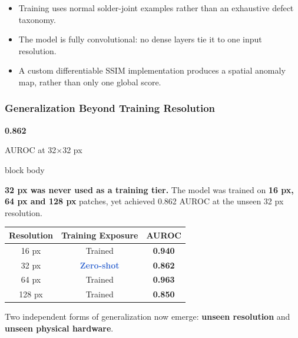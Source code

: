 \documentclass[aspectratio=169,11pt]{beamer}
\newcommand{\emphred}[1]{\textcolor{secondary}{#1}}
\newcommand{\emphhighlight}[1]{\textcolor{primary}{\textbf{#1}}}
\newcommand{\good}[1]{\textcolor{accent}{\textbf{#1}}}
\newcommand{\warning}[1]{\textcolor{highlight}{\textbf{#1}}}
\begin{document}
\begin{frame}
\begin{center}
\begin{tikzpicture}
\end{tikzpicture}

\end{center}

\vspace{0.15cm}

\begin{itemize}
    \item Training uses \emphred{normal solder-joint examples}
    rather than an exhaustive defect taxonomy.
    \item The model is fully convolutional:
    \emphred{no dense layers tie it to one input resolution}.
    \item A custom differentiable SSIM implementation produces a
    \emphred{spatial anomaly map}, rather than only one global score.
\end{itemize}

\end{frame}


\begin{frame}\frametitle{\emphred{Generalization Beyond Training Resolution}}

\begin{center}
{\fontsize{32}{36}\selectfont
\bfseries
\color{accent}
0.862}

{\footnotesize AUROC at 32$\times$32 px}

\vspace{0.08cm}

\begin{beamercolorbox}[
    wd=0.84\paperwidth,
    rounded=true,
    shadow=true,
    sep=0.3em
  ]{block body}
\begin{center}
\footnotesize
\textbf{32 px was never used as a training tier.}
The model was trained on
\emphhighlight{16 px, 64 px and 128 px}
patches, yet achieved
\emphred{0.862 AUROC}
at the unseen 32 px resolution.
\end{center}
\end{beamercolorbox}

\vspace{0.1cm}

\footnotesize
\begin{tabular}{c|c|c}
\textbf{Resolution} & \textbf{Training Exposure} & \textbf{AUROC} \\
\hline
16 px & Trained & \good{0.940} \\
32 px & \warning{Zero-shot} & \good{0.862} \\
64 px & Trained & \good{0.963} \\
128 px & Trained & \good{0.850} \\
\end{tabular}

\vspace{0.08cm}

\scriptsize
Two independent forms of generalization now emerge:
\textbf{unseen resolution} and
\textbf{unseen physical hardware}.
\end{center}

\end{frame}
\end{document}
